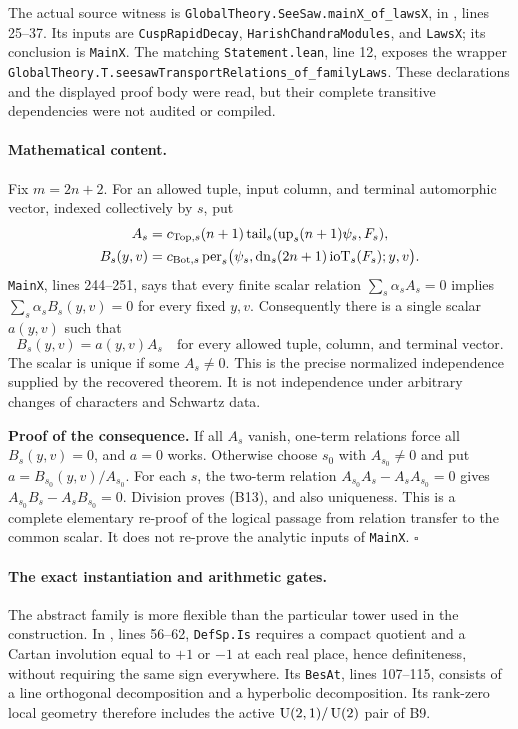 \documentclass[11pt]{article}
\theoremstyle{definition}\newtheorem{definition}[theorem]{Definition}\newtheorem{remark}[theorem]{Remark}
\begin{document}
The actual source witness is
\nolinkurl{GlobalTheory.SeeSaw.mainX_of_lawsX}, in
, lines 25--37. Its inputs are \texttt{CuspRapidDecay}, \texttt{HarishChandraModules}, and \texttt{LawsX}; its conclusion is \texttt{MainX}. The matching \texttt{Statement.lean}, line 12, exposes the wrapper
\nolinkurl{GlobalTheory.T.seesawTransportRelations_of_familyLaws}.
These declarations and the displayed proof body were read, but their complete transitive dependencies were not audited or compiled.

\paragraph{Mathematical content.}
Fix $m=2n+2$. For an allowed tuple, input column, and terminal automorphic vector, indexed collectively by $s$, put
\begin{align*}
 A_s&=c_{{\rm Top},s}(n+1)
      \operatorname{tail}_s(\operatorname{up}_s(n+1)\psi_s,F_s),\\
 B_s(y,v)&=c_{{\rm Bot},s}
      \operatorname{per}_s\bigl(\psi_s,
       \operatorname{dn}_s(2n+1)\operatorname{ioT}_s(F_s);y,v\bigr).
\end{align*}
\texttt{MainX}, lines 244--251, says that every finite scalar relation
$\sum_s\alpha_s A_s=0$ implies
$\sum_s\alpha_s B_s(y,v)=0$ for every fixed $y,v$.
Consequently there is a single scalar $a(y,v)$ such that
\[
 B_s(y,v)=a(y,v)A_s
 \quad\text{for every allowed tuple, column, and terminal vector.}
 \tag{B13}
\]
The scalar is unique if some $A_s\ne0$. This is the precise normalized independence supplied by the recovered theorem. It is not independence under arbitrary changes of characters and Schwartz data.

\textbf{Proof of the consequence.} If all $A_s$ vanish, one-term relations force all $B_s(y,v)=0$, and $a=0$ works. Otherwise choose $s_0$ with $A_{s_0}\ne0$ and put $a=B_{s_0}(y,v)/A_{s_0}$. For each $s$, the two-term relation
$A_{s_0}A_s-A_sA_{s_0}=0$ gives
$A_{s_0}B_s-A_sB_{s_0}=0$. Division proves (B13), and also uniqueness. This is a complete elementary re-proof of the logical passage from relation transfer to the common scalar. It does not re-prove the analytic inputs of \texttt{MainX}. \hfill$\square$

\paragraph{The exact instantiation and arithmetic gates.}
The abstract family is more flexible than the particular tower used in the construction. In , lines 56--62, \texttt{DefSp.Is} requires a compact quotient and a Cartan involution equal to $+1$ or $-1$ at each real place, hence definiteness, without requiring the same sign everywhere. Its \texttt{BesAt}, lines 107--115, consists of a line orthogonal decomposition and a hyperbolic decomposition. Its rank-zero local geometry therefore includes the active $\operatorname{U}(2,1)/\operatorname{U}(2)$ pair of B9.
\end{document}
